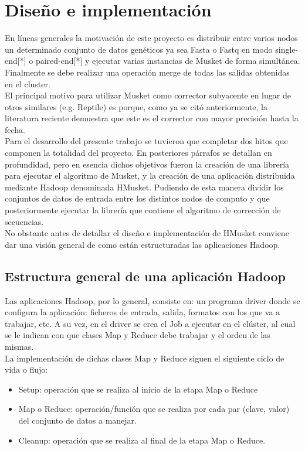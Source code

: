 \documentclass[conference]{IEEEtran}
\begin{document}
\section{Diseño e implementación}

En líneas generales la motivación de este proyecto es distribuir entre varios nodos un determinado conjunto de datos genéticos ya sea Fasta o Fastq en modo single-end[*] o paired-end[*] y ejecutar varias instancias de Musket de forma simultánea. Finalmente se debe realizar una operación merge de todas las salidas obtenidas en el cluster.\\
El principal motivo para utilizar Musket como corrector subyacente en lugar de otros similares (e.g. Reptile) es porque, como ya se citó anteriormente, la literatura reciente demuestra que este es el corrector con mayor precisión hasta la fecha.\\

Para el desarrollo del presente trabajo se tuvieron que completar dos hitos que componen la totalidad del proyecto. En posteriores párrafos se detallan en profundidad, pero en esencia dichos objetivos fueron la creación de una librería para ejecutar el algoritmo de Musket, y la creación de una aplicación distribuida mediante Hadoop denominada HMusket. Pudiendo de esta manera dividir los conjuntos de datos de entrada entre los distintos nodos de computo y que posteriormente ejecutar la librería que contiene el algoritmo de corrección de secuencias.\\

No obstante antes de detallar el diseño e implementación de HMusket conviene dar una visión general de como están estructuradas las aplicaciones Hadoop.

\subsection{Estructura general de una aplicación Hadoop}
Las aplicaciones Hadoop, por lo general, consiste en: un programa driver donde se configura la aplicación: ficheros de entrada, salida, formatos con los que va a trabajar, etc. A su vez, en el driver se crea el Job a ejecutar en el clúster, al cual se le indican con que clases Map y Reduce debe trabajar y el orden de las mismas.\\
La implementación de dichas clases Map y Reduce siguen el siguiente ciclo de vida o flujo:

\begin{itemize}
	\item Setup: operación que se realiza al inicio de la etapa Map o Reduce
	\item Map o Reduce: operación/función que se realiza por cada par (clave, valor) del conjunto de datos a manejar.
	\item Cleanup: operación que se realiza al final de la etapa Map o Reduce.
\end{itemize}
\end{document}
